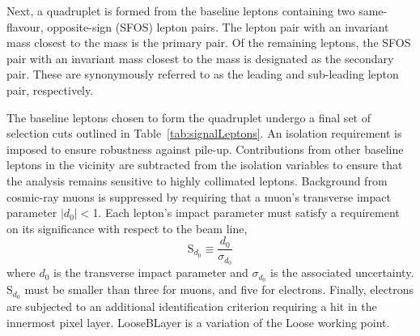 Next, a quadruplet is formed from the baseline leptons containing two same-flavour, opposite-sign (SFOS) lepton pairs. The lepton pair with an invariant mass closest to the \Z mass is the primary pair. Of the remaining leptons, the SFOS pair with an invariant mass closest to the \Z mass is designated as the secondary pair. These are synonymously referred to as the leading and sub-leading lepton pair, respectively. 

The baseline leptons chosen to form the quadruplet undergo a final set of selection cuts outlined in Table~\ref{tab:signalLeptons}. An isolation requirement is imposed to ensure robustness against pile-up. Contributions from other baseline leptons in the vicinity are subtracted from the isolation variables to ensure that the analysis remains sensitive to highly collimated leptons. Background from cosmic-ray muons is suppressed by requiring that a muon's transverse impact parameter $|d_0|<$\unit{1}{\mm}. Each lepton's impact parameter must satisfy a requirement on its significance with respect to the beam line,
\begin{equation}
    \text{S}_{d_0}\equiv\dfrac{d_0}{\sigma_{d_0}}
\end{equation}
where $d_0$ is the transverse impact parameter and $\sigma_{d_0}$ is the associated uncertainty. $\text{S}_{d_0}$ must be smaller than three for muons, and five for electrons. Finally, electrons are subjected to an additional identification criterion requiring a hit in the innermost pixel layer. LooseBLayer is a variation of the Loose working point. 

